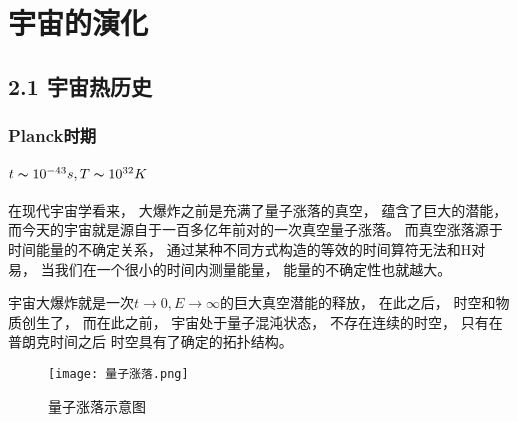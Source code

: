 \documentclass[8pt]{beamer}
\begin{document}
\section{宇宙的演化}
    \subsection{2.1 宇宙热历史}
        \begin{frame}[fragile]
            \frametitle{Planck时期}
            \framesubtitle{$t\thicksim10^{-43}s,T\thicksim10^{32}K$}
            \begin{multicols}{2} 
                \qquad
                在现代宇宙学看来， 
                大爆炸之前是充满了量子涨落的真空，
                蕴含了巨大的潜能，
                而今天的宇宙就是源自于一百多亿年前对的一次真空量子涨落。
                而真空涨落源于时间能量的不确定关系，
                通过某种不同方式构造的等效的时间算符无法和H对易，
                当我们在一个很小的时间内测量能量，
                能量的不确定性也就越大。

                \qquad
                宇宙大爆炸就是一次$t\to 0,E\to \infty$的巨大真空潜能的释放，
                在此之后，
                时空和物质创生了，
                而在此之前，
                宇宙处于量子混沌状态，
                不存在连续的时空，
                只有在普朗克时间之后
                时空具有了确定的拓扑结构。

                \begin{figure}[h]
                    \centering
                    \texttt{[image: 量子涨落.png]}  
                    \caption{量子涨落示意图}
                \end{figure}
            \end{multicols}
        \end{frame}
\end{document}
